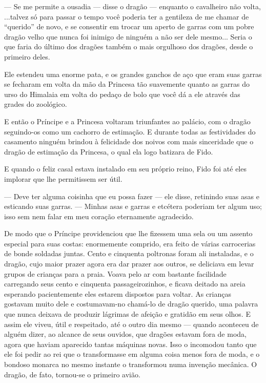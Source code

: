 — Se me permite a ousadia — disse o dragão — enquanto o cavalheiro não
volta, ...talvez só para passar o tempo você poderia ter a gentileza
de me chamar de “querido” de novo, e se consentir em trocar um aperto
de garras com um pobre dragão velho que nunca foi inimigo de ninguém
a não ser dele mesmo... Seria o que faria do último dos dragões
também o mais orgulhoso dos dragões, desde o primeiro deles.

Ele estendeu uma enorme pata, e os grandes ganchos de aço que eram
suas garras se fecharam em volta da mão da Princesa tão suavemente
quanto as garras do urso do Himalaia em volta do pedaço de bolo que
você dá a ele através das grades do zoológico.

E então o Príncipe e a Princesa voltaram triunfantes ao palácio, com o
dragão seguindo-os como um cachorro de estimação. E durante todas as
festividades do casamento ninguém brindou à felicidade dos noivos com
mais sinceridade que o dragão de estimação da Princesa, o qual ela
logo batizara de Fido.

E quando o feliz casal estava instalado em seu próprio reino, Fido foi
até eles implorar que lhe permitissem ser útil.

— Deve ter alguma coisinha que eu possa fazer — ele disse, retinindo
suas asas e esticando suas garras. — Minhas asas e garras e etcétera
poderiam ter algum uso; isso sem nem falar em meu coração eternamente
agradecido.

De modo que o Príncipe providenciou que lhe fizessem uma sela ou um
assento especial para suas costas: enormemente comprido, era feito de
várias carrocerias de bonde soldadas juntas. Cento e cinquenta
poltronas foram ali instaladas, e o dragão, cujo maior prazer agora
era dar prazer aos outros, se deliciava em levar grupos de crianças
para a praia. Voava pelo ar com bastante facilidade carregando seus
cento e cinquenta passageirozinhos, e ficava deitado na areia
esperando pacientemente eles estarem dispostos para voltar. As
crianças gostavam muito dele e costumavam-no chamá-lo de dragão
querido, uma palavra que nunca deixava de produzir lágrimas de
afeição e gratidão em seus olhos. E assim ele viveu, útil e
respeitado, até o outro dia mesmo — quando aconteceu de alguém dizer,
ao alcance de seus ouvidos, que dragões estavam fora de moda, agora
que haviam aparecido tantas máquinas novas. Isso o incomodou tanto
que ele foi pedir ao rei que o transformasse em alguma coisa menos
fora de moda, e o bondoso monarca no mesmo instante o transformou
numa invenção mecânica. O dragão, de fato, tornou-se o primeiro
avião.


